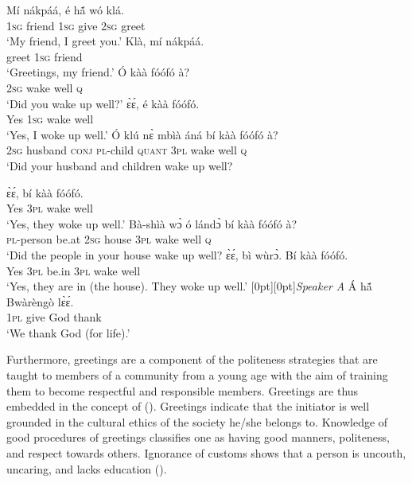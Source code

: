 \documentclass[output=paper,colorlinks,citecolor=brown]{langscibook}
\begin{document}
\ea \label{ex:nightgreet2}
\begin{xlist}
\ex 
    \gll Mí	nákpáá, 	é	hã́	wó	klá. \\
	\textsc{1sg}	friend		\textsc{1sg}	give	\textsc{2sg}	greet\\
\glt ‘My friend, I greet you.’ 
\ex
    \gll Klà,	mí	nákpáá.\\
	greet	\textsc{1sg}	friend\\
	\glt ‘Greetings, my friend.’ 
\ex
   \gll Ó	kàà	fóófó	à?  \\
	\textsc{2sg}	wake	well	\textsc{q}\\
\glt 	‘Did you wake up well?’ 
\ex 
    \gll ɛ̀ɛ́,	é	kàà	fóófó.\\
	Yes	\textsc{1sg}	wake	well		\\
	\glt ‘Yes, I woke up well.’  
\ex
 \gll Ó	klú		nɛ̀	mbìà		áná	bí	kàà	fóófó	à?\\
	\textsc{2sg}	husband	\textsc{conj}	\textsc{pl}-child	\textsc{quant}	\textsc{3pl}	wake	well	\textsc{q}\\
\glt	‘Did your husband and children wake up well? 

\ex 
    \gll ɛ̀ɛ́,	bí	kàà	fóófó. \\
	Yes	\textsc{3pl}	wake	well		\\
\glt	‘Yes, they woke up well.’ 
 \ex 
    \gll Bà-shìà	wɔ̀	ó	lándɔ̀	bí	kàà	fóófó	à? \\
	\textsc{pl}-person	be.at	\textsc{2sg}	house	\textsc{3pl}	wake	well	\textsc{q}\\
	\glt ‘Did the people in your house wake up well?
 \ex 
    \gll ɛ̀ɛ́,	bì	wùrɔ̀.	Bí	kàà	fóófó. \\
	Yes	\textsc{3pl}	be.in	\textsc{3pl}	wake	well\\
	\glt ‘Yes, they are in (the house). They woke up well.’
	\hfill \raisebox{1.2\baselineskip}[0pt][0pt]{\textit{Speaker A}}
 \ex 
   \gll Á	hã́	Bwàrèngò	lɛ̀ɛ́.\\
	\textsc{1pl}	give	God		thank\\
\glt 	‘We thank God (for life).’ 
\end{xlist}
\z

Furthermore, greetings are a component of the politeness strategies that are taught to members of a community from a young age with the aim of training them to become respectful and responsible members. Greetings are thus embedded in the concept of  (\cite{BrownandLevinson1987, Obeng1996, Obeng1999}). Greetings indicate that the initiator is well grounded in the cultural ethics of the society he/she belongs to. Knowledge of good procedures of greetings classifies one as having good manners, politeness, and respect towards others. Ignorance of customs shows that a person is uncouth, uncaring, and lacks education (\cite[174]{Wójtowicz2021}). 
\end{document}

